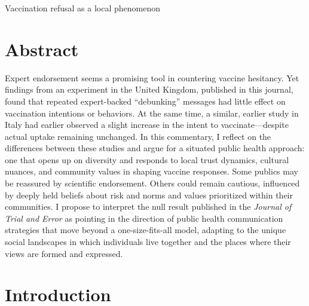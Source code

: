 \documentclass[authordate, empirical]{jote-new-article}
\author[1]{\mbox{Martijn van der Meer\orcid{0000-0002-5557-0225}}}
\affil[1]{Erasmus University, Rotterdam, the Netherlands}
\begin{document}
\begin{frontmatter}
  \maketitle
  \begin{abstract}
    \printabstracttext
  \end{abstract}
\end{frontmatter}


	Vaccination refusal as a local phenomenon







	\section{Abstract}



	Expert endorsement seems a promising tool in countering vaccine hesitancy. Yet findings from an experiment in the United Kingdom, published in this journal, found that repeated expert-backed “debunking” messages had little effect on vaccination intentions or behaviors. At the same time, a similar, earlier study in Italy had earlier observed a slight increase in the intent to vaccinate—despite actual uptake remaining unchanged. In this commentary, I reflect on the differences between these studies and argue for a situated public health approach: one that opens up on diversity and responds to local trust dynamics, cultural nuances, and community values in shaping vaccine responses. Some publics may be reassured by scientific endorsement. Others could remain cautious, influenced by deeply held beliefs about risk and norms and values prioritized within their communities. I propose to interpret the null result published in the \emph{Journal of Trial and Error} as pointing in the direction of public health communication strategies that move beyond a one-size-fits-all model, adapting to the unique social landscapes in which individuals live together and the places where their views are formed and expressed.







	\section{Introduction}
\end{document}
